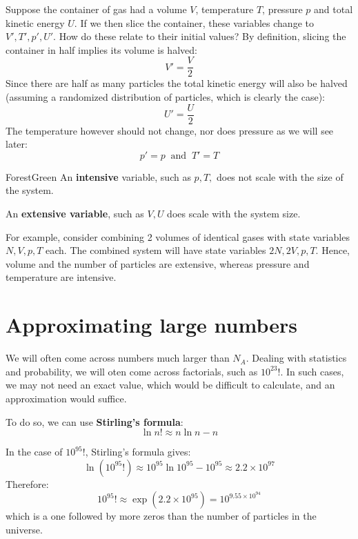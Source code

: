 \documentclass[a4paper,11pt,oneside]{book}
\begin{document}
Suppose the container of gas had a volume $V$, temperature $T$, pressure $p$ and total kinetic energy $U$. If we then slice the container, these variables change to $V', T', p', U'$. How do these relate to their initial values?
By definition, slicing the container in half implies its volume is halved:
\begin{equation}
    V'=\frac{V}{2}
\end{equation}
Since there are half as many particles the total kinetic energy will also be halved (assuming a randomized distribution of particles, which is clearly the case):
\begin{equation}
    U'=\frac{U}{2}
\end{equation}
The temperature however should not change, nor does pressure as we will see later:
\begin{equation}
    p'=p \ \text{ and } \ T' = T
\end{equation}
\begin{mybox}{ForestGreen}{\textbf{}}
An \textbf{intensive} variable, such as $p,T,$ does not scale with the size of the system. 


An \textbf{extensive variable}, such as $V,U$ does scale with the system size. 
\end{mybox}

For example, consider combining 2 volumes of identical gases with state variables $N,V,p,T$ each. The combined system will have state variables $2N,2V,p,T$. Hence, volume and the number of particles are extensive, whereas pressure and temperature are intensive. 
\section{Approximating large numbers}
We will often come across numbers much larger than $N_A$. Dealing with statistics and probability, we will oten come across factorials, such as $10^{23}!$. In such cases, we may not need an exact value, which would be difficult to calculate, and an approximation would suffice. 

To do so, we can use \textbf{Stirling's formula}:
\begin{equation}
    \ln n! \approx n \ln n - n
\end{equation}

In the case of $10^{95}!$, Stirling's formula gives:
\begin{equation}
\ln(10^{95}!) \approx 10^{95} \ln 10^{95} - 10^{95} \approx 2.2 \times 10^{97}
\end{equation}
Therefore:
\begin{equation}
    10^{95}! \approx \exp (2.2 \times 10^{95})= 10^{9.55 \times 10^{94}}
\end{equation}
which is a one followed by more zeros than the number of particles in the universe. 
\end{document}
